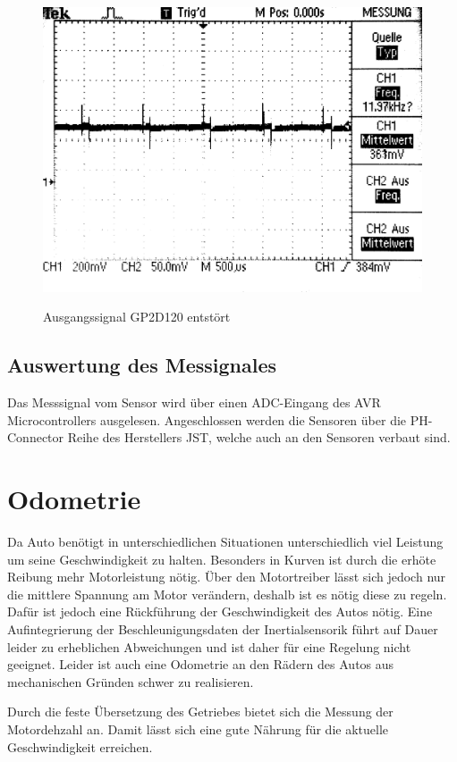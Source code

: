 \begin{figure}[H]
\centering
\includegraphics[width=.8\textwidth]{IR_lessspikes.png}\\
\caption{Ausgangssignal GP2D120 entstört}%
\label{fig:IR_lessspikes}
\end{figure}

\subsection{Auswertung des Messignales}
Das Messsignal vom Sensor wird über einen ADC-Eingang des AVR Microcontrollers ausgelesen. Angeschlossen werden die Sensoren über die PH-Connector Reihe des Herstellers JST, welche auch an den Sensoren verbaut sind.



\section{Odometrie}
Da Auto benötigt in unterschiedlichen Situationen unterschiedlich viel Leistung um seine Geschwindigkeit zu halten.
Besonders in Kurven ist durch die erhöte Reibung mehr Motorleistung nötig. Über den Motortreiber lässt sich jedoch nur
die mittlere Spannung am Motor verändern, deshalb ist es nötig diese zu regeln. Dafür ist jedoch eine Rückführung der Geschwindigkeit
des Autos nötig. Eine Aufintegrierung der Beschleunigungsdaten der Inertialsensorik führt auf Dauer leider zu erheblichen
Abweichungen und ist daher für eine Regelung nicht geeignet. Leider ist auch eine Odometrie an den Rädern des Autos
aus mechanischen Gründen schwer zu realisieren. 

Durch die feste Übersetzung des Getriebes bietet sich die Messung der Motordehzahl an. Damit lässt sich eine gute Nährung für die aktuelle Geschwindigkeit erreichen. 

